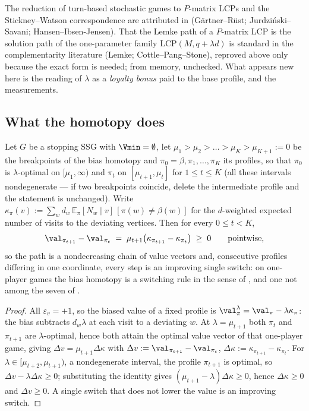 \begin{remark}\label{fsa:attribution}
The reduction of turn-based stochastic games to $P$-matrix LCPs and the
Stickney--Watson correspondence are attributed in 
(G\"artner--R\"ust; Jurdzi\'nski--Savani; Hansen--Ibsen-Jensen). That the
Lemke path of a $P$-matrix LCP is the solution path of the one-parameter
family $\mathrm{LCP}(M,q+\lambda d)$ is standard in the complementarity
literature (Lemke; Cottle--Pang--Stone), reproved above only because the
exact form is needed; from memory, unchecked. What appears new here is the
reading of $\lambda$ as a \emph{loyalty bonus} paid to the base profile,
 and the measurements.
\end{remark}

\subsection{What the homotopy does}\label{sec:fsa-what}

\begin{proposition}\label{fsa:one-improving}
Let $G$ be a stopping SSG with $\Vmin=\emptyset$, let
$\mu_1>\mu_2>\dots>\mu_K>\mu_{K+1}:=0$ be the breakpoints of the bias homotopy
and $\pi_0=\beta,\pi_1,\dots,\pi_K$ its profiles, so that $\pi_0$ is
$\lambda$-optimal on $[\mu_1,\infty)$ and $\pi_t$ on $[\mu_{t+1},\mu_t]$ for
$1\le t\le K$ (all these intervals nondegenerate --- if two breakpoints
coincide, delete the intermediate profile and the statement is unchanged).
Write $\kappa_\pi(v):=\sum_{w}d_w\,\mathbb E_\pi[N_w\mid v]\,[\pi(w)\ne\beta(w)]$
for the $d$-weighted expected number of visits to the deviating vertices.
Then for every $0\le t<K$,
\[
  \val_{\pi_{t+1}}-\val_{\pi_t}\;=\;\mu_{t+1}\bigl(\kappa_{\pi_{t+1}}-\kappa_{\pi_t}\bigr)\;\ge\;0
  \qquad\text{pointwise,}
\]
so the path is a nondecreasing chain of value vectors and, consecutive
profiles differing in one coordinate, every step is an improving single
switch: on one-player games the bias homotopy is a switching rule in the
sense of , and one not among the seven of
.
\end{proposition}

\begin{proof}
All $\varepsilon_v=+1$, so the biased value of a fixed profile is
$\val^{\lambda}_\pi=\val_\pi-\lambda\kappa_\pi$: the bias subtracts
$d_w\lambda$ at each visit to a deviating $w$. At $\lambda=\mu_{t+1}$ both
$\pi_t$ and $\pi_{t+1}$ are $\lambda$-optimal, hence both attain the optimal
value vector of that one-player game, giving
$\Delta v=\mu_{t+1}\Delta\kappa$ with
$\Delta v:=\val_{\pi_{t+1}}-\val_{\pi_t}$,
$\Delta\kappa:=\kappa_{\pi_{t+1}}-\kappa_{\pi_t}$. For
$\lambda\in[\mu_{t+2},\mu_{t+1})$, a nondegenerate interval, the profile
$\pi_{t+1}$ is optimal, so $\Delta v-\lambda\Delta\kappa\ge0$; substituting
the identity gives $(\mu_{t+1}-\lambda)\Delta\kappa\ge0$, hence
$\Delta\kappa\ge0$ and $\Delta v\ge0$. A single switch that does not lower the value is an improving
switch.
\end{proof}

